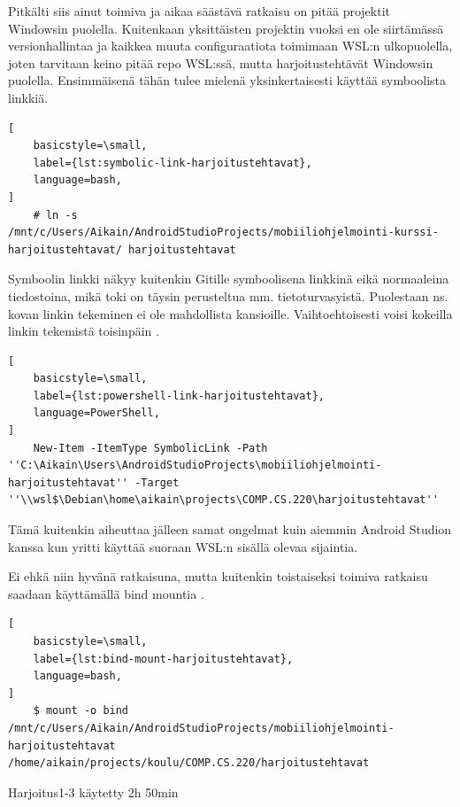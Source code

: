 Pitkälti siis ainut toimiva ja aikaa säästävä ratkaisu on pitää projektit
Windowsin puolella. Kuitenkaan yksittäisten projektin vuoksi en ole siirtämässä
versionhallintaa ja kaikkea muuta configuraatiota toimimaan WSL:n ulkopuolella,
joten tarvitaan keino pitää repo WSL:ssä, mutta harjoitustehtävät Windowsin
puolella. Ensimmäisenä tähän tulee mielenä yksinkertaisesti käyttää symboolista
linkkiä.

\begin{lstlisting}[
    basicstyle=\small,
    label={lst:symbolic-link-harjoitustehtavat},
    language=bash,
]
    # ln -s /mnt/c/Users/Aikain/AndroidStudioProjects/mobiiliohjelmointi-kurssi-harjoitustehtavat/ harjoitustehtavat
\end{lstlisting}

Symboolin linkki näkyy kuitenkin Gitille symboolisena linkkinä eikä normaaleina
tiedostoina, mikä toki on täysin perusteltua mm. tietoturvasyistä. Puolestaan
ns. kovan linkin tekeminen ei ole mahdollista kansioille. Vaihtoehtoisesti
voisi kokeilla linkin tekemistä toisinpäin
\parencite{StackoverflowWSLSymlink}.

\begin{lstlisting}[
    basicstyle=\small,
    label={lst:powershell-link-harjoitustehtavat},
    language=PowerShell,
]
    New-Item -ItemType SymbolicLink -Path ''C:\Aikain\Users\AndroidStudioProjects\mobiiliohjelmointi-harjoitustehtavat'' -Target ''\\wsl$\Debian\home\aikain\projects\COMP.CS.220\harjoitustehtavat''
\end{lstlisting}

Tämä kuitenkin aiheuttaa jälleen samat ongelmat kuin aiemmin Android Studion
kanssa kun yritti käyttää suoraan WSL:n sisällä olevaa sijaintia.

Ei ehkä niin hyvänä ratkaisuna, mutta kuitenkin toistaiseksi toimiva ratkaisu
saadaan käyttämällä bind mountia \parencite{BaeldungBindMounts}.

\begin{lstlisting}[
    basicstyle=\small,
    label={lst:bind-mount-harjoitustehtavat},
    language=bash,
]
    $ mount -o bind /mnt/c/Users/Aikain/AndroidStudioProjects/mobiiliohjelmointi-harjoitustehtavat /home/aikain/projects/koulu/COMP.CS.220/harjoitustehtavat
\end{lstlisting}


Harjoitus1-3 käytetty 2h 50min

